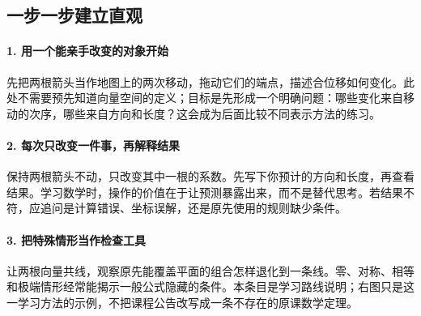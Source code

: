 \subsection*{一步一步建立直观}

\paragraph{1. 用一个能亲手改变的对象开始}

先把两根箭头当作地图上的两次移动，拖动它们的端点，描述合位移如何变化。此处不需要预先知道向量空间的定义；目标是先形成一个明确问题：哪些变化来自移动的次序，哪些来自方向和长度？这会成为后面比较不同表示方法的练习。



\paragraph{2. 每次只改变一件事，再解释结果}

保持两根箭头不动，只改变其中一根的系数。先写下你预计的方向和长度，再查看结果。学习数学时，操作的价值在于让预测暴露出来，而不是替代思考。若结果不符，应追问是计算错误、坐标误解，还是原先使用的规则缺少条件。



\paragraph{3. 把特殊情形当作检查工具}

让两根向量共线，观察原先能覆盖平面的组合怎样退化到一条线。零、对称、相等和极端情形经常能揭示一般公式隐藏的条件。本条目是学习路线说明；右图只是这一学习方法的示例，不把课程公告改写成一条不存在的原课数学定理。
